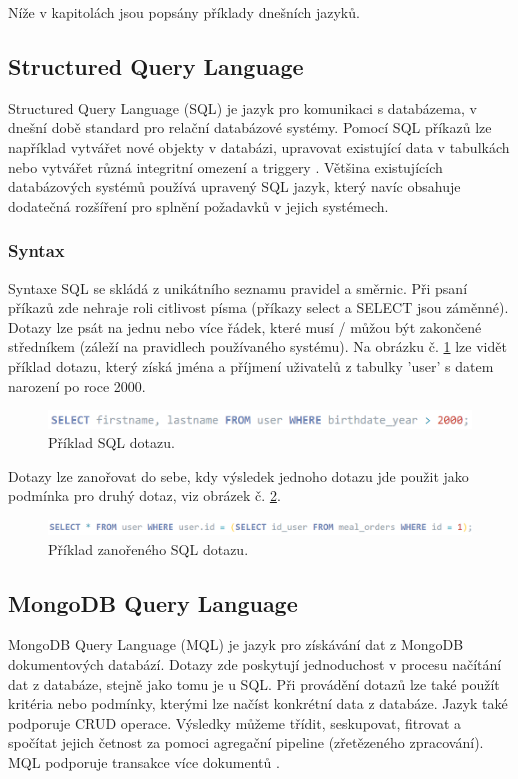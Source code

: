 \noindent Níže v kapitolách jsou popsány příklady dnešních jazyků.
\subsection{Structured Query Language}
Structured Query Language (\gls{SQL}) je jazyk pro komunikaci s databázema, v dnešní době standard pro relační databázové systémy. Pomocí \gls{SQL} příkazů lze například vytvářet nové objekty v databázi, upravovat existující data v tabulkách nebo vytvářet různá integritní omezení a triggery \cite{bookRelational}. Většina existujících databázových systémů používá upravený \gls{SQL} jazyk, který navíc obsahuje dodatečná rozšíření pro splnění požadavků v jejich systémech.

\subsubsection{Syntax}
Syntaxe \gls{SQL} se skládá z unikátního seznamu pravidel a směrnic. Při psaní příkazů zde nehraje roli citlivost písma (příkazy select a SELECT jsou záměnné). Dotazy lze psát na jednu nebo více řádek, které musí / můžou být zakončené středníkem (záleží na pravidlech používaného systému). Na obrázku č. \ref{fig:sql} lze vidět příklad dotazu, který získá jména a příjmení uživatelů z tabulky 'user' s datem narození po roce 2000.
	\begin{figure}[H]
	\centering
	\includegraphics[width=13cm]{img/databaze/sql}
	\caption{Příklad \gls{SQL} dotazu.}
	\label{fig:sql}
	\end{figure}

\noindent Dotazy lze zanořovat do sebe, kdy výsledek jednoho dotazu jde použit jako podmínka pro druhý dotaz, viz obrázek č. \ref{fig:sql2}.
	\begin{figure}[H]
	\centering
	\includegraphics[width=14cm]{img/databaze/sql2}
	\caption{Příklad zanořeného \gls{SQL} dotazu.}
	\label{fig:sql2}
	\end{figure}

\subsection{MongoDB Query Language}
MongoDB Query Language (\gls{MQL}) je jazyk pro získávání dat z MongoDB dokumentových databází. Dotazy zde poskytují jednoduchost v procesu načítání dat z databáze, stejně jako tomu je u \gls{SQL}. Při provádění dotazů lze také použít kritéria nebo podmínky, kterými lze načíst konkrétní data z databáze. Jazyk také podporuje \gls{CRUD} operace. Výsledky můžeme třídit, seskupovat, fitrovat a spočítat jejich četnost za pomoci agregační pipeline (zřetězeného zpracování). \gls{MQL} podporuje transakce více dokumentů \cite{mongo_lang}.

